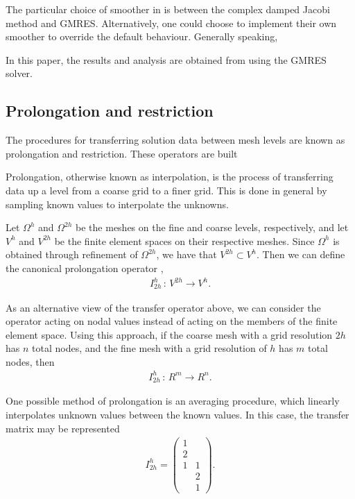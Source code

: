 \cite{elman}
The particular choice of smoother in \oomph is between the complex damped Jacobi method and GMRES.
Alternatively, one could choose to implement their own smoother to override the default behaviour.
Generally speaking, 

In this paper, the results and analysis are obtained from using the GMRES solver.




\subsection{Prolongation and restriction}

The procedures for transferring solution data between mesh levels are known as prolongation and restriction.
These operators are built 

Prolongation, otherwise known as interpolation, is the process of transferring data up a level from a coarse grid to a finer grid.
This is done in general by sampling known values to interpolate the unknowns.

Let $\Omega^h$ and $\Omega^{2h}$ be the meshes on the fine and coarse levels, respectively, and let $V^{h}$ and $V^{2h}$ be the finite element spaces on their respective meshes.
Since $\Omega^{h}$ is obtained through refinement of $\Omega^{2h}$, we have that $V^{2h}\subset V^h$.
Then we can define the canonical prolongation operator \cite{volker},
\begin{align}
	I^h_{2h} \, : \, V^{2h} \rightarrow V^h.
\end{align}

As an alternative view of the transfer operator above, we can consider the operator acting on nodal values instead of acting on the members of the finite element space.
Using this approach, if the coarse mesh with a grid resolution $2h$ has $n$ total nodes, and the fine mesh with a grid resolution of $h$ has $m$ total nodes, then
\begin{align}
	I^h_{2h} \, : \, R^m \rightarrow R^n.
\end{align}

One possible method of prolongation is an averaging procedure, which linearly interpolates unknown values between the known values.
In this case, the transfer matrix may be represented 
\begin{align}
	I^h_{2h} = \begin{pmatrix}
		1 \\ 2 \\ 1 & 1 \\ & 2 \\ & 1
	\end{pmatrix}.
\end{align}


